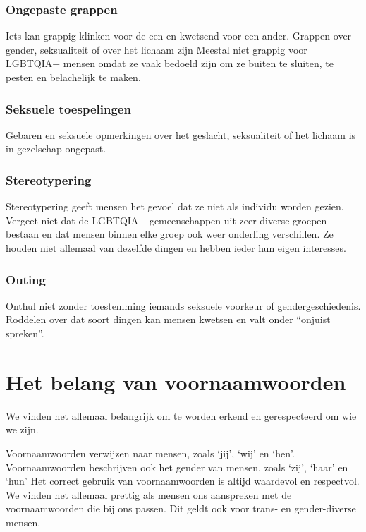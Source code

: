 \documentclass[12pt,openany]{book}
\begin{document}
\subsubsection*{Ongepaste grappen} 

Iets kan grappig klinken voor de een en kwetsend voor een ander. Grappen over gender, seksualiteit of over het lichaam zijn Meestal niet grappig voor LGBTQIA+ mensen omdat ze vaak bedoeld zijn om ze buiten te sluiten, te pesten en belachelijk te maken. 

\subsubsection*{Seksuele toespelingen}

Gebaren en seksuele opmerkingen over het geslacht, seksualiteit of het lichaam is in gezelschap ongepast.

\subsubsection*{Stereotypering}

Stereotypering geeft mensen het gevoel dat ze niet als individu worden gezien. Vergeet niet dat de LGBTQIA+-gemeenschappen uit zeer diverse groepen bestaan en dat mensen binnen elke groep ook weer onderling verschillen. Ze houden niet allemaal van dezelfde dingen en hebben ieder hun eigen interesses. 

\subsubsection*{Outing}

Onthul niet zonder toestemming iemands seksuele voorkeur of gendergeschiedenis. Roddelen over dat soort dingen kan mensen kwetsen en valt onder “onjuist spreken”.

\section*{Het belang van voornaamwoorden}

We vinden het allemaal belangrijk om te worden erkend en gerespecteerd om wie we zijn.

Voornaamwoorden verwijzen naar mensen, zoals ‘jij’, ‘wij’ en ‘hen’. Voornaamwoorden beschrijven ook het gender van mensen, zoals ‘zij’, ‘haar’ en ‘hun’ Het correct gebruik van voornaamwoorden is altijd waardevol en respectvol. We vinden het allemaal prettig als mensen ons aanspreken met de voornaamwoorden die bij ons passen. Dit geldt ook voor trans- en gender-diverse mensen. 
\end{document}
